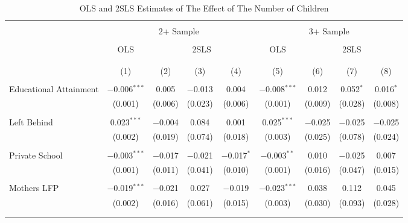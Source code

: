 

\begin{sidewaystable}[!htbp] \centering 
  \caption{OLS and 2SLS Estimates of The Effect of The Number of Children} 
  \label{tab:03} 
\begin{threeparttable}
\begin{tabular}{@{\extracolsep{5pt}}lcccccccc} 
\\[-1.8ex]\hline 
\hline \\[-1.8ex] 
 & \multicolumn{4}{c}{2+ Sample} & \multicolumn{4}{c}{3+ Sample} \\
\cline{2-5}  \cline{6-9} \\
 & OLS & \multicolumn{3}{c}{2SLS} & OLS & \multicolumn{3}{c}{2SLS} \\ 
\cline{3-5}  \cline{7-9} \\[-1.8ex]
\\[-1.8ex] & (1) & (2) & (3) & (4) & (5) & (6) & (7) & (8)\\ 
\hline \\[-1.8ex] 
 Educational Attainment & $-$0.006$^{***}$ & 0.005 & $-$0.013 & 0.004 & $-$0.008$^{***}$ & 0.012 & 0.052$^{*}$ & 0.016$^{*}$ \\ 
  & (0.001) & (0.006) & (0.023) & (0.006) & (0.001) & (0.009) & (0.028) & (0.008) \\ 
  & & & & & & & & \\ 
 Left Behind & 0.023$^{***}$ & $-$0.004 & 0.084 & 0.001 & 0.025$^{***}$ & $-$0.025 & $-$0.025 & $-$0.025 \\ 
  & (0.002) & (0.019) & (0.074) & (0.018) & (0.003) & (0.025) & (0.078) & (0.024) \\ 
  & & & & & & & & \\ 
 Private School & $-$0.003$^{***}$ & $-$0.017 & $-$0.021 & $-$0.017$^{*}$ & $-$0.003$^{**}$ & 0.010 & $-$0.025 & 0.007 \\ 
  & (0.001) & (0.011) & (0.041) & (0.010) & (0.001) & (0.016) & (0.047) & (0.015) \\ 
  & & & & & & & & \\ 
 Mothers LFP & $-$0.019$^{***}$ & $-$0.021 & 0.027 & $-$0.019 & $-$0.023$^{***}$ & 0.038 & 0.112 & 0.045 \\ 
  & (0.002) & (0.016) & (0.061) & (0.015) & (0.003) & (0.030) & (0.093) & (0.028) \\ 
  & & & & & & & & \\ 
\hline \\[-1.8ex] 

\end{tabular}
\end{threeparttable}
\end{sidewaystable}
